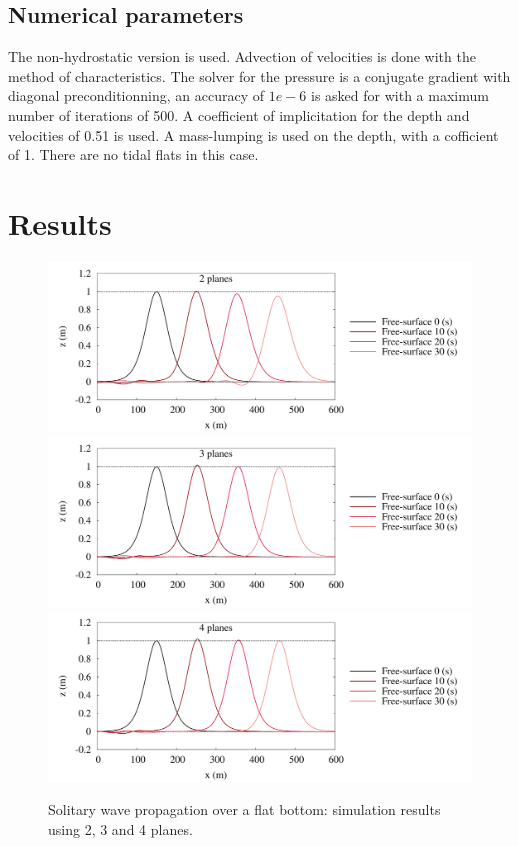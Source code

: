 \subsection{Numerical parameters}
%
The non-hydrostatic version is used. Advection of velocities is done with the method of characteristics.
The solver for the pressure is a conjugate gradient with diagonal preconditionning,
an accuracy of $1e-6$ is asked for with a maximum number of iterations of 500.
A coefficient of implicitation for the depth and velocities of 0.51 is used.
A mass-lumping is used on the depth, with a cofficient of 1.
There are no tidal flats in this case.
%
\section{Results}
%
\begin{figure}[H]
\begin{center}
  \includegraphics[scale=0.6]{img/figure3a.pdf}
  \includegraphics[scale=0.6]{img/figure3b.pdf}
  \includegraphics[scale=0.6]{img/figure3c.pdf}
\caption{Solitary wave propagation over a flat bottom: simulation results using 2, 3 and 4 planes.}
\label{fig:solit_results}
\end{center}
\end{figure}
